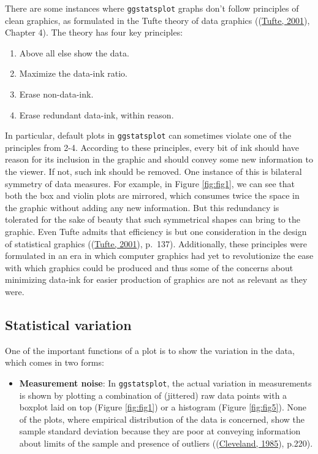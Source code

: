 \documentclass[
]{article}
\providecommand{\tightlist}{%
  \setlength{\itemsep}{0pt}\setlength{\parskip}{0pt}}
\begin{document}
There are some instances where \texttt{ggstatsplot} graphs don't follow principles of
clean graphics, as formulated in the Tufte theory of data graphics
((\protect\hyperlink{ref-tufteVisualDisplayQuantitative2001}{Tufte, 2001}), Chapter 4). The theory has four key
principles:

\begin{enumerate}
\def\labelenumi{\arabic{enumi}.}
\tightlist
\item
  Above all else show the data.
\item
  Maximize the data-ink ratio.
\item
  Erase non-data-ink.
\item
  Erase redundant data-ink, within reason.
\end{enumerate}

In particular, default plots in \texttt{ggstatsplot} can sometimes violate one of the
principles from 2-4. According to these principles, every bit of ink should have
reason for its inclusion in the graphic and should convey some new information
to the viewer. If not, such ink should be removed. One instance of this is
bilateral symmetry of data measures. For example, in Figure \ref{fig:fig1}, we
can see that both the box and violin plots are mirrored, which consumes twice
the space in the graphic without adding any new information. But this redundancy
is tolerated for the sake of beauty that such symmetrical shapes can bring to
the graphic. Even Tufte admits that efficiency is but one consideration in the
design of statistical graphics ((\protect\hyperlink{ref-tufteVisualDisplayQuantitative2001}{Tufte, 2001}),
p.~137). Additionally, these principles were formulated in an era in which
computer graphics had yet to revolutionize the ease with which graphics could be
produced and thus some of the concerns about minimizing data-ink for easier
production of graphics are not as relevant as they were.

\hypertarget{statistical-variation}{%
\subsection{Statistical variation}\label{statistical-variation}}

One of the important functions of a plot is to show the variation in the data,
which comes in two forms:

\begin{itemize}
\tightlist
\item
  \textbf{Measurement noise}: In \texttt{ggstatsplot}, the actual variation in
  measurements is shown by plotting a combination of (jittered) raw data
  points with a boxplot laid on top (Figure \ref{fig:fig1}) or a histogram
  (Figure \ref{fig:fig5}). None of the plots, where empirical distribution of
  the data is concerned, show the sample standard deviation because they are
  poor at conveying information about limits of the sample and presence of
  outliers ((\protect\hyperlink{ref-clevelandElementsGraphingData1985}{Cleveland, 1985}), p.220).
\end{itemize}
\end{document}

